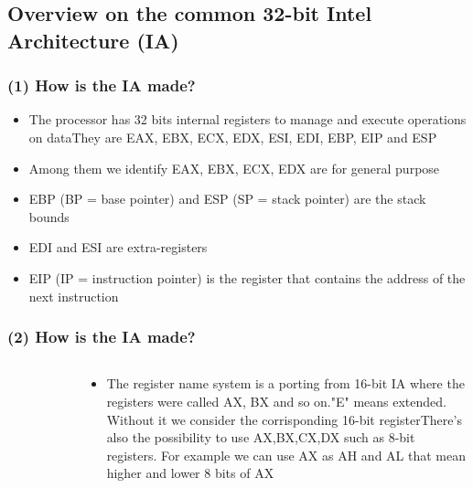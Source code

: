 \documentclass[]{beamer}
\begin{document}
	\subsection{Overview on the common 32-bit Intel Architecture (IA)}
		\begin{frame}
			\frametitle{(1) How is the IA made?}
			\begin{itemize}
				\item{The processor has 32 bits internal registers to manage and execute operations on data\newline They are EAX, EBX, ECX, EDX, ESI, EDI, EBP, EIP and ESP }
				\item{Among them we identify EAX, EBX, ECX, EDX are for general purpose}
				\item{EBP (BP = base pointer) and ESP (SP = stack pointer) are the stack bounds }
				\item{EDI and ESI are extra-registers}
				\item{EIP (IP = instruction pointer) is the register that contains the address of the next instruction}
			\end{itemize}
		\end{frame}
		\begin{frame}
			\frametitle{(2) How is the IA made?}
			\begin{columns}
				\begin{column}[left]{2.5in}
					\begin{figure}
						\includegraphics[height=1.6in]{images/registers.jpeg}
						\label{Registers Division}
					\end{figure}
				\end{column}
				\begin{column}[right]{2.5in}
					\begin{itemize}
							\item{The register name system is a porting from 16-bit IA where the registers were called AX, BX and so on.\newline "E" means extended. Without it we consider the corrisponding 16-bit register\newline There's also the possibility to use AX,BX,CX,DX such as 8-bit registers. For example we can use AX as AH and AL that mean higher and lower 8 bits of AX}
					\end{itemize}
				\end{column}
			\end{columns}
		\end{frame}
\end{document}
